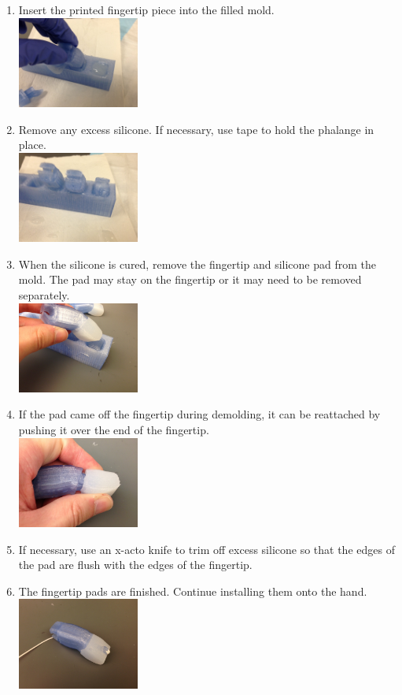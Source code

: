 \documentclass[11pt]{article}
\begin{document}
\begin{enumerate}
\item Insert the printed fingertip piece into the filled mold.\\ \includegraphics[width=4cm]{images/pad_casting/Inserting phalange.jpg}
\item Remove any excess silicone. If necessary, use tape to hold the phalange in place.\\ \includegraphics[width=4cm]{images/pad_casting/Phalanges in mold.jpg}
\item When the silicone is cured, remove the fingertip and silicone pad from the mold. The pad may stay on the fingertip or it may need to be removed separately.\\ \includegraphics[width=4cm]{images/pad_casting/Removing from mold.jpg}
\item If the pad came off the fingertip during demolding, it can be reattached by pushing it over the end of the fingertip.\\ \includegraphics[width=4cm]{images/pad_casting/Installing finger pad.jpg}
\item If necessary, use an x-acto knife to trim off excess silicone so that the edges of the pad are flush with the edges of the fingertip.
\item The fingertip pads are finished. Continue installing them onto the hand.\\ \includegraphics[width=4cm]{images/pad_casting/Assembled fingertip.jpg}
\end{enumerate}
\end{document}
